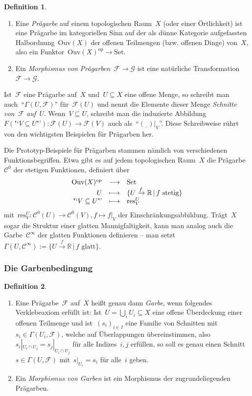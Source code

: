 \documentclass[a4paper,ngerman,12pt]{scrartcl}
\theoremstyle{definition}
\newtheorem{defn}{Definition}[section]
\theoremstyle{plain}
\theoremstyle{remark}
\newcommand{\xra}[1]{\xrightarrow{#1}}
\newcommand{\RR}{\mathbb{R}}
\newcommand{\C}{\mathcal{C}}
\newcommand{\F}{\mathcal{F}}
\newcommand{\G}{\mathcal{G}}
\newcommand{\Ouv}{\mathrm{Ouv}}
\newcommand{\res}{\mathrm{res}}
\newcommand{\freist}{\underline{\ \ }}
\newcommand{\op}{\mathrm{op}}
\newcommand{\Set}{\mathrm{Set}}
\renewcommand{\_}{\mathpunct{.}\,}
\newcommand{\?}{\,{:}\,}
\begin{document}
\begin{defn}\begin{enumerate}
\item Eine \emph{Prägarbe} auf einem topologischen Raum~$X$ (oder einer
Örtlichkeit) ist eine Prägarbe im kategoriellen Sinn auf der
als dünne Kategorie aufgefassten Halb\-ord\-nung~$\Ouv(X)$ der offenen
Teilmengen (bzw.  offenen Dinge) von~$X$, also ein Funktor~$\Ouv(X)^\op \to
\Set$.
\item Ein \emph{Morphismus von Prägarben}~$\F \to \G$ ist eine natürliche
Transformation~$\F \to \G$.
\end{enumerate}
\end{defn}

Ist~$\F$ eine Prägarbe auf~$X$ und~$U \subseteq X$ eine offene
Menge, so schreibt man auch~"`$\Gamma(U, \F)$"' für~$\F(U)$ und nennt die
Elemente dieser Menge \emph{Schnitte von~$\F$ auf~$U$}. Wenn~$V \subseteq U$,
schreibt man die induzierte Abbildung~$F(\text{"`$V \subseteq U$"'}) : \F(U)
\to \F(V)$ auch als~"`$(\freist)|_V$"'. Diese Schreibweise rührt von den
wichtigsten Beispielen für Prägarben her.

Die Prototyp-Beispiele für Prägarben stammen nämlich von verschiedenen
Funktionsbegriffen. Etwa gibt es auf jedem topologischen Raum~$X$ die
Prägarbe~$\C^0$ der stetigen Funktionen, definiert über
\[ \begin{array}{@{}rcl@{}}
  \Ouv(X)^\op &\longrightarrow& \Set \\
  U &\longmapsto& \{ U \xra{f} \RR \,|\, \text{$f$ stetig} \} \\
  \text{"`$V \subseteq U$"'} &\longmapsto& \res^U_V
\end{array} \]
mit~$\res^U_V : \C^0(U) \to \C^0(V), f \mapsto f|_V$ der
Einschränkungsabbildung.  Trägt~$X$ sogar die Struktur einer glatten
Mannigfaltigkeit, kann man analog auch die Garbe~$\C^\infty$ der glatten
Funktionen definieren -- man setzt $\Gamma(U, \C^\infty) := \{ U \xra{f} \RR
\,|\, \text{$f$ glatt} \}$.


\subsubsection*{Die Garbenbedingung}

\begin{defn}\begin{enumerate}
\item Eine Prägarbe~$\F$ auf~$X$ heißt genau dann \emph{Garbe}, wenn
folgendes Verklebeaxiom erfüllt ist: Ist~$U = \bigcup_i U_i \subseteq X$ eine
offene Überdeckung einer offenen Teilmenge und ist~$(s_i)_{i \in I}$ eine
Familie von Schnitten mit~$s_i \in \Gamma(U_i, \F)$, welche auf Überlappungen
übereinstimmen, also
$s_i|_{U_i \cap U_j} = s_j|_{U_i \cap U_j}$
für alle Indizes~$i,j$ erfüllen, so soll es genau einen Schnitt~$s \in
\Gamma(U,\F)$ mit~$s|_{U_i} = s_i$ für alle~$i$ geben.
\item Ein \emph{Morphismus von Garben} ist ein Morphismus der zugrundeliegenden
Prägarben.
\end{enumerate}\end{defn}
\end{document}
